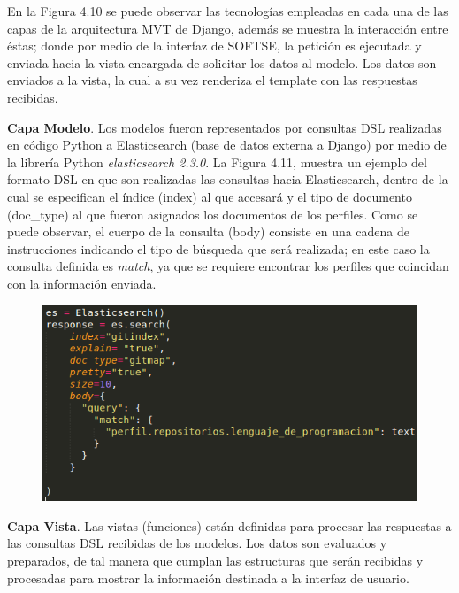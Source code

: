 En la Figura 4.10 se puede observar las tecnologías empleadas en cada una de las capas de la arquitectura MVT de Django, además se muestra la interacción entre éstas; donde por medio de la interfaz de SOFTSE, la petición es ejecutada y enviada hacia la vista encargada de solicitar los datos al modelo. Los datos son enviados a la vista, la cual a su vez renderiza el template con las respuestas recibidas.


\textbf{Capa Modelo}. Los modelos fueron representados por consultas DSL realizadas en código Python a Elasticsearch (base de datos externa a Django) por medio de la librería Python \textit{elasticsearch 2.3.0}. La Figura 4.11, muestra un ejemplo del formato DSL en que son realizadas las consultas hacia Elasticsearch, dentro de la cual se especifican el índice (index) al que accesará y el tipo de documento (doc\_type) al que fueron asignados los documentos de los perfiles. Como se puede observar, el cuerpo de la consulta (body) consiste en una cadena de instrucciones indicando el tipo de búsqueda que será realizada; en este caso la consulta definida es \textit{match}, ya que se requiere encontrar los perfiles que coincidan con la información enviada.

\begin{figure}[H]
	\centering
	\includegraphics[height=0.2\textheight]{fig01/dsl_query}
	\label{fig:RHP02}
\end{figure}



\textbf{Capa Vista}.
Las vistas (funciones) están definidas para procesar las respuestas a las consultas DSL recibidas de los modelos. Los datos son evaluados y preparados, de tal manera que cumplan las estructuras que serán recibidas y procesadas para mostrar la información destinada a la interfaz de usuario.

